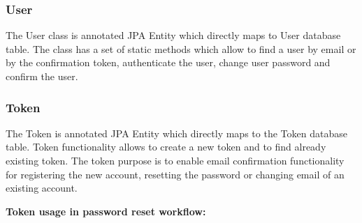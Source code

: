 \documentclass[12pt,twoside,a4paper]{report}
\begin{document}
\subsubsection{User}
The User class is annotated JPA Entity which directly maps to User database table. The class has a set of static methods which allow to find a user by email or by the confirmation token, authenticate the user, change user password and confirm the user.

\subsubsection{Token}
The Token is annotated JPA Entity which directly maps to the Token database table. Token functionality allows to create a new token and to find already existing token. The token purpose is to enable email confirmation functionality for registering the new account, resetting the password or changing email of an existing account.

\textbf{Token usage in password reset workflow:}
\end{document}
